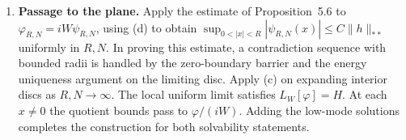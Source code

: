 \documentclass[11pt]{amsart}
\theoremstyle{definition}
\newcommand{\nss}[1]{\lVert #1\rVert_{**}}
\begin{document}
\begin{enumerate}[label=(\alph*)]
        parts gives
        \[
          \int_0^R\left(w^2r\,|v'|^2+\frac{w^2}{r}\,v\cdot Mv\right)\,dr=0 .
        \]
        The regular-mode asymptotics at zero give the vanishing boundary term
        there. The eigenvalues of $M$ are at least $k^2-2k>0$ for $k\ge3$.
        Thus $v=0$.
  \item \textbf{Passage to the plane.} Apply the estimate of Proposition~5.6
        to $\varphi_{R,N}=iW\psi_{R,N}$, using (d) to obtain
        $\sup_{0<|x|<R}|\psi_{R,N}(x)|\le C\nss h$ uniformly in $R,N$.
        In proving this estimate, a contradiction sequence with bounded radii
        is handled by the zero-boundary barrier and the energy uniqueness
        argument on the limiting disc. Apply (c) on expanding interior discs
        as $R,N\to\infty$. The local uniform limit satisfies $L_W[\varphi]=H$.
        At each $x\ne0$ the quotient bounds pass to $\varphi/(iW)$.
        Adding the low-mode solutions completes the construction for both
        solvability statements.
\end{enumerate}
\end{document}
